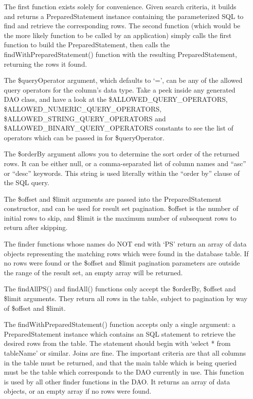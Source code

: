 \documentclass[letterpaper,10pt,english]{sphinxmanual}
\begin{document}
The first function exists solely for convenience.  Given search criteria, it builds and returns a
PreparedStatement instance containing the parameterized SQL to find and retrieve the corresponding
rows.  The second function (which would be the more likely function to be called by an application)
simply calls the first function to build the PreparedStatement, then calls the
findWithPreparedStatement() function with the resulting PreparedStatement, returning the rows it
found.

The \$queryOperator argument, which defaults to `=', can be any of the allowed query operators for
the column's data type.  Take a peek inside any generated DAO class, and have a look at the
\$ALLOWED\_QUERY\_OPERATORS, \$ALLOWED\_NUMERIC\_QUERY\_OPERATORS, \$ALLOWED\_STRING\_QUERY\_OPERATORS and
\$ALLOWED\_BINARY\_QUERY\_OPERATORS constants to see the list of operators which can be passed in for
\$queryOperator.

The \$orderBy argument allows you to determine the sort order of the returned rows.  It can be either
null, or a comma-separated list of column names and ``asc'' or ``desc'' keywords.  This string is used
literally within the ``order by'' clause of the SQL query.

The \$offset and \$limit arguments are passed into the PreparedStatement constructor, and can be used
for result set pagination.  \$offset is the number of initial rows to skip, and \$limit is the maximum
number of subsequent rows to return after skipping.

The finder functions whose names do NOT end with `PS' return an array of data objects representing
the matching rows which were found in the database table.  If no rows were found or the \$offset and
\$limit pagination parameters are outside the range of the result set, an empty array will be
returned.

The findAllPS() and findAll() functions only accept the \$orderBy, \$offset and \$limit arguments.
They return all rows in the table, subject to pagination by way of \$offset and \$limit.

The findWithPreparedStatement() function accepts only a single argument: a PreparedStatement
instance which contains an SQL statement to retrieve the desired rows from the table.  The statement
should begin with `select * from tableName' or similar.  Joins are fine.  The important criteria are
that all columns in the table must be returned, and that the main table which is being queried must
be the table which corresponds to the DAO currently in use.  This function is used by all other
finder functions in the DAO.  It returns an array of data objects, or an empty array if no rows were
found.
\end{document}
